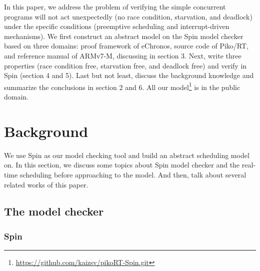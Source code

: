 In this paper, we address the problem of verifying the simple concurrent programs will not act unexpectedly (no race condition, starvation, and deadlock) under the specific conditions (preemptive scheduling and interrupt-driven mechanisms). We first construct an abstract model on the Spin model checker based on three domains: proof framework of eChronos, source code of Piko/RT, and reference manual of ARMv7-M, discussing in section 3. Next, write three properties (race condition free, starvation free, and deadlock free) and verify in Spin (section 4 and 5). Last but not least, discuss the background knowledge and summarize the conclusions in section 2 and 6. All our model\footnote{\url{https://github.com/kaizsv/pikoRT-Spin.git}} is in the public domain.

\section{Background}
We use Spin as our model checking tool and build an abstract scheduling model on. In this section, we discuss some topics about Spin model checker and the real-time scheduling before approaching to the model. And then, talk about several related works of this paper.

\subsection{The model checker}
\subsubsection{Spin}

